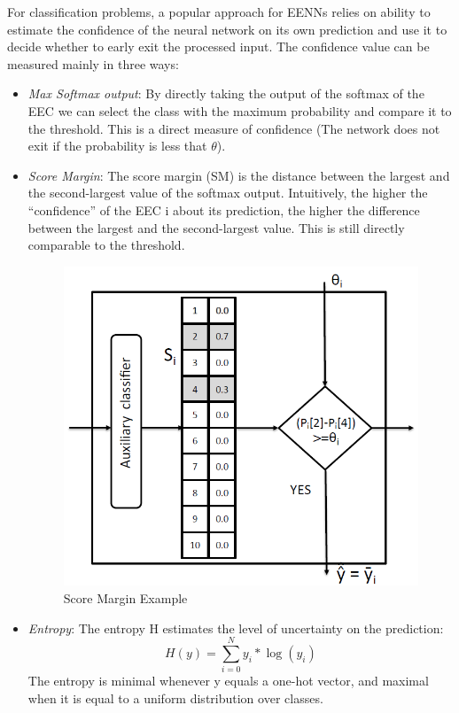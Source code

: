 \documentclass{article}
\begin{document}
      For classification problems, a popular approach for EENNs relies on ability to estimate the confidence of the neural network on its own prediction and use it to decide whether to early exit the processed input. The confidence value can be measured mainly in three ways:
      \begin{itemize}
        \item \emph{Max Softmax output}: By directly taking the output of the softmax of the EEC we can select the class with the maximum probability and compare it to the threshold. This is a direct measure of confidence (The network does not exit if the probability is less that $\theta$).
        \item \emph{Score Margin}: The score margin (SM) is the distance between the largest and the second-largest value of the softmax output. Intuitively, the higher the “confidence” of the EEC i about its
        prediction, the higher the difference between the largest and the second-largest value. This is still directly comparable to the threshold.
        \begin{figure}[H]
          \includegraphics[scale=0.35]{../Images/SM_EEC.png}
          \centering
          \caption{Score Margin Example}
        \end{figure}
        \item \emph{Entropy}: The entropy H estimates the level of uncertainty on the prediction:
        \begin{equation}
          H(y) = \sum_{i=0}^{N} y_i * \log(y_i)
        \end{equation}
        The entropy is minimal whenever y equals a one-hot vector, and maximal when it is equal to a uniform distribution over classes.
      \end{itemize}
\end{document}
